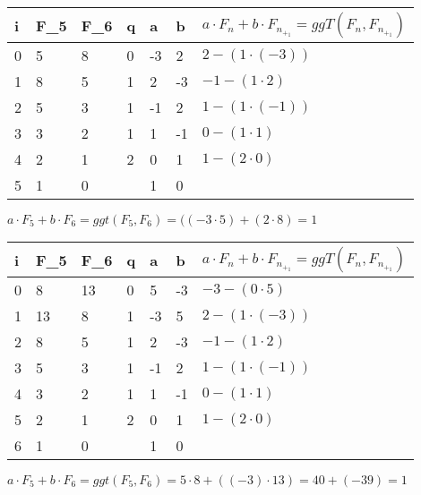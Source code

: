 \documentclass[11pt,a4paper]{article}
\begin{document}
\begin{center}
	\begin{tabular}{ | l | l | l | l | l | l | l|}
		\hline
		i&F_5&F_6&q&a&b&$a\cdot F_n + b \cdot F_n_+_1 = ggT(F_n,F_n_+_1)$ \\ \hline		
		0&5&8&0&-3&2&$2-(1 \cdot (-3) )$ \\ \hline
		1&8&5&1&2&-3&$-1-(1 \cdot 2)$\\ \hline
		2&5&3&1&-1&2&$1-(1 \cdot (-1))$ \\ \hline
		3&3&2&1&1&-1&$0-(1 \cdot 1)$ \\ \hline
		4&2&1&2&0&1&$1-(2\cdot 0)$ \\ \hline
		5&1&0&&1&0&\\ \hline
		\hline	
	\end{tabular}
\end{center}
$a\cdot F_5 +b \cdot F_6 = ggt(F_5,F_6)=((-3\cdot5)+(2\cdot8)=1$
\begin{center}
	\begin{tabular}{ | l | l | l | l | l | l | l|}
		\hline
		i&F_5&F_6&q&a&b&$a\cdot F_n + b \cdot F_n_+_1 = ggT(F_n,F_n_+_1)$ \\ \hline		
		0&8&13&0&5&-3&$-3-(0 \cdot 5 )$ \\ \hline
		1&13&8&1&-3&5&$2-(1 \cdot (-3) )$ \\ \hline
		2&8&5&1&2&-3&$-1-(1 \cdot 2)$\\ \hline
		3&5&3&1&-1&2&$1-(1 \cdot (-1))$ \\ \hline
		4&3&2&1&1&-1&$0-(1 \cdot 1)$ \\ \hline
		5&2&1&2&0&1&$1-(2\cdot 0)$ \\ \hline
		6&1&0&&1&0&\\ \hline
		\hline	
	\end{tabular}
\end{center}


$a\cdot F_5 +b \cdot F_6 = ggt(F_5,F_6) = 5 \cdot 8 + ((-3)\cdot 13) = 40+(-39)=1$
\end{document}
